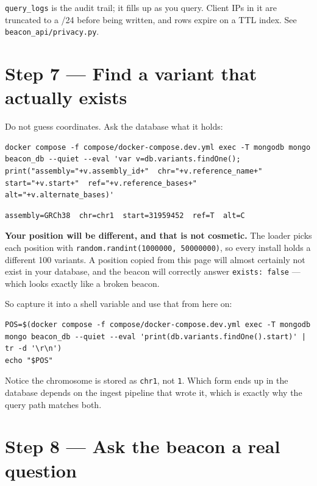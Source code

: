 \documentclass[
  10pt,
]{article}
\begin{document}
\texttt{query\_logs} is the audit trail; it fills up as you query.
Client IPs in it are truncated to a /24 before being written, and rows
expire on a TTL index. See \texttt{beacon\_api/privacy.py}.

\section{Step 7 --- Find a variant that actually
exists}\label{step-7-find-a-variant-that-actually-exists}

Do not guess coordinates. Ask the database what it holds:

\begin{verbatim}
docker compose -f compose/docker-compose.dev.yml exec -T mongodb mongo beacon_db --quiet --eval 'var v=db.variants.findOne(); print("assembly="+v.assembly_id+"  chr="+v.reference_name+"  start="+v.start+"  ref="+v.reference_bases+"  alt="+v.alternate_bases)'
\end{verbatim}

\begin{verbatim}
assembly=GRCh38  chr=chr1  start=31959452  ref=T  alt=C
\end{verbatim}

\textbf{Your position will be different, and that is not cosmetic.} The
loader picks each position with
\texttt{random.randint(1000000,\ 50000000)}, so every install holds a
different 100 variants. A position copied from this page will almost
certainly not exist in your database, and the beacon will correctly
answer \texttt{exists:\ false} --- which looks exactly like a broken
beacon.

So capture it into a shell variable and use that from here on:

\begin{verbatim}
POS=$(docker compose -f compose/docker-compose.dev.yml exec -T mongodb mongo beacon_db --quiet --eval 'print(db.variants.findOne().start)' | tr -d '\r\n')
echo "$POS"
\end{verbatim}

Notice the chromosome is stored as \texttt{chr1}, not \texttt{1}. Which
form ends up in the database depends on the ingest pipeline that wrote
it, which is exactly why the query path matches both.

\section{Step 8 --- Ask the beacon a real
question}\label{step-8-ask-the-beacon-a-real-question}
\end{document}
